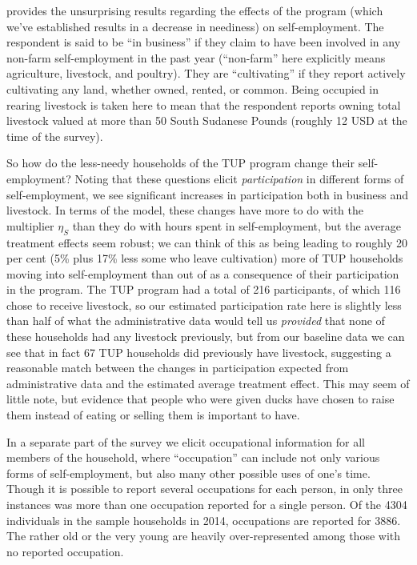 \documentclass[12pt,letterpaper]{article}
\begin{document}
 provides the unsurprising results regarding
the effects of the program (which we've established results in a
decrease in neediness) on self-employment.  
The respondent is said to be ``in business'' if they claim to have been
involved in any non-farm self-employment in the past year (``non-farm''
here explicitly means agriculture, livestock, and poultry).  They are
``cultivating'' if they report actively cultivating any land, whether
owned, rented, or common.  Being occupied in rearing livestock is
taken here to mean that the respondent reports owning total livestock
valued at more than 50 South Sudanese Pounds (roughly 12 USD at the
time of the survey).

So how do the less-needy households of the TUP program change their
self-employment?  Noting that these questions elicit \emph{participation} in
different forms of self-employment, we see significant increases in
participation both in business and livestock.  In terms of the model,
these changes have more to do with the multiplier \(\eta_S\) than they
do with hours spent in self-employment, but the average treatment
effects seem robust; we can think of this as being leading to roughly
20 per cent (5\% plus 17\% less some who leave cultivation) more of TUP
households moving into self-employment than out of as a consequence of
their participation in the program.  The TUP program had a total of
216 participants, of which 116 chose to receive livestock, so our
estimated participation rate here is slightly less than half of what
the administrative data would tell us \emph{provided} that none of these
households had any livestock previously, but from our baseline data we
can see that in fact 67 TUP households did previously have livestock,
suggesting a reasonable match between the changes in participation
expected from administrative data and the estimated average treatment
effect.  This may seem of little note, but evidence that people
who were given ducks have chosen to raise them instead of eating or
selling them is important to have.

In a separate part of the survey we elicit occupational information
for all members of the household, where ``occupation'' can include not
only various forms of self-employment, but also many other possible
uses of one's time.  Though it is possible to report
several occupations for each person, in only three instances was more
than one occupation reported for a single person.  Of the 4304
individuals in the sample households in 2014, occupations are reported
for 3886.  The rather old or the very young are heavily
over-represented among those with no reported occupation.   
\end{document}
